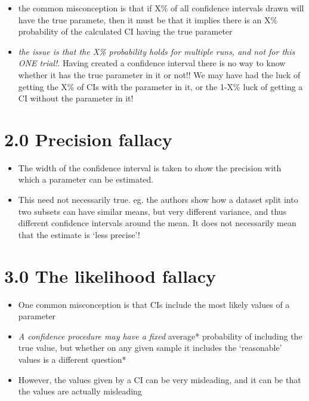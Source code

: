 \documentclass[
]{book}
\providecommand{\tightlist}{%
  \setlength{\itemsep}{0pt}\setlength{\parskip}{0pt}}
\begin{document}
\begin{itemize}
\tightlist
\item
  the common misconception is that if X\% of all confidence intervals drawn will have the true paramete, then it
  must be that it implies there is an X\% probability of the calculated CI having the true parameter
\item
  \emph{the issue is that the X\% probability holds for multiple runs, and not for this ONE trial!}. Having created a confidence interval
  there is no way to know whether it has the true parameter in it or not!! We may have had the luck of getting the X\% of CIs with the
  parameter in it, or the 1-X\% luck of getting a CI without the parameter in it!
\end{itemize}

\hypertarget{precision-fallacy}{%
\section{2.0 Precision fallacy}\label{precision-fallacy}}

\begin{itemize}
\tightlist
\item
  The width of the confidence interval is taken to show the precision with which a parameter can be estimated.
\item
  This need not necessarily true. eg. the authors show how a dataset split into two subsets can have similar means, but very different variance, and thus different confidence intervals around the mean. It does not necessarily mean that the estimate is `less precise'!
\end{itemize}

\hypertarget{the-likelihood-fallacy}{%
\section{3.0 The likelihood fallacy}\label{the-likelihood-fallacy}}

\begin{itemize}
\tightlist
\item
  One common misconception is that CIs include the most likely values of a parameter
\item
  \emph{A confidence procedure may have a fixed }average* probability of including the true value, but whether on any given sample it includes the `reasonable' values is a different question*
\item
  However, the values given by a CI can be very misleading, and it can be that the values are actually misleading
\end{itemize}
\end{document}

